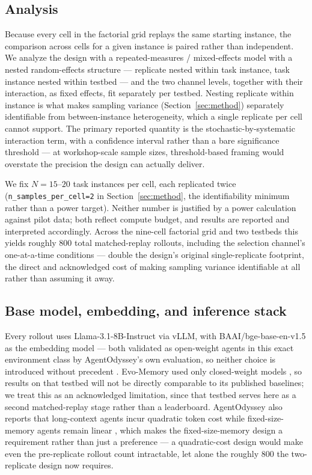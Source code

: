 \documentclass{article}
\begin{document}
\subsection{Analysis}

Because every cell in the factorial grid replays the same starting instance, the comparison across cells for a given instance is paired rather than independent. We analyze the design with a repeated-measures / mixed-effects model with a nested random-effects structure --- replicate nested within task instance, task instance nested within testbed --- and the two channel levels, together with their interaction, as fixed effects, fit separately per testbed. Nesting replicate within instance is what makes sampling variance (Section~\ref{sec:method}) separately identifiable from between-instance heterogeneity, which a single replicate per cell cannot support. The primary reported quantity is the stochastic-by-systematic interaction term, with a confidence interval rather than a bare significance threshold --- at workshop-scale sample sizes, threshold-based framing would overstate the precision the design can actually deliver.

We fix $N = 15$--$20$ task instances per cell, each replicated twice (\texttt{n\_samples\_per\_cell=2} in Section~\ref{sec:method}, the identifiability minimum rather than a power target). Neither number is justified by a power calculation against pilot data; both reflect compute budget, and results are reported and interpreted accordingly. Across the nine-cell factorial grid and two testbeds this yields roughly 800 total matched-replay rollouts, including the selection channel's one-at-a-time conditions --- double the design's original single-replicate footprint, the direct and acknowledged cost of making sampling variance identifiable at all rather than assuming it away.

\subsection{Base model, embedding, and inference stack}

Every rollout uses Llama-3.1-8B-Instruct via vLLM, with BAAI/bge-base-en-v1.5 as the embedding model --- both validated as open-weight agents in this exact environment class by AgentOdyssey's own evaluation, so neither choice is introduced without precedent \citep{zhang2026agentodyssey}. Evo-Memory used only closed-weight models \citep{wei2025evomemory}, so results on that testbed will not be directly comparable to its published baselines; we treat this as an acknowledged limitation, since that testbed serves here as a second matched-replay stage rather than a leaderboard. AgentOdyssey also reports that long-context agents incur quadratic token cost while fixed-size-memory agents remain linear \citep{zhang2026agentodyssey}, which makes the fixed-size-memory design a requirement rather than just a preference --- a quadratic-cost design would make even the pre-replicate rollout count intractable, let alone the roughly 800 the two-replicate design now requires.
\end{document}
